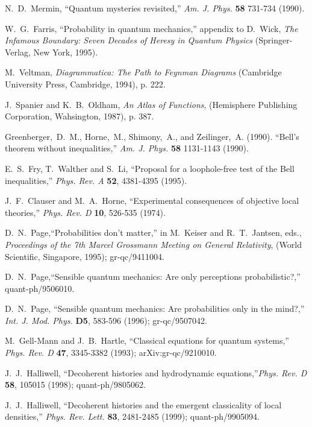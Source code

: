 \documentclass[12pt]{article}
\begin{document}
{\begin{thebibliography}{99}
 N.~D.~Mermin,  ``Quantum mysteries revisited,'' {\em Am. J. Phys.}\/
{\bf 58} 731-734 (1990).

 W.~G.~Farris, ``Probability in quantum mechanics,'' appendix to
D.~Wick, {\em The Infamous Boundary: Seven Decades of Heresy in Quantum Physics}
(Springer-Verlag, New York, 1995). 




 M.~Veltman, {\em Diagrammatica: The Path to Feynman
Diagrams}\/ (Cambridge University Press, Cambridge, 1994),  p. 222.



J.~Spanier and K.~B.~Oldham, {\em An Atlas of Functions},\/ (Hemisphere Publishing Corporation,
Wahsington, 1987), p. 387.


 Greenberger,~D.~M., Horne,~M., Shimony,~A., and Zeilinger,~A. (1990).  ``Bell's theorem without
inequalities,'' {\em Am. J. Phys.}\/ {\bf 58} 1131-1143 (1990). 

E.~S.~Fry, T.~Walther and S.~Li, ``Proposal for a loophole-free test of the Bell inequalities,''
{\em Phys. Rev. A}\/ {\bf 52}, 4381-4395 (1995).

J.~F.~Clauser and M.~A.~Horne, ``Experimental consequences of objective local theories,''
{\em Phys. Rev. D}\/ {\bf 10}, 526-535 (1974).

D.~N.~Page,``Probabilities don't matter,'' in M.~Keiser and
R.~T.~Jantsen, eds., {\em Proceedings of the 7th Marcel Grossmann
Meeting on General Relativity},\/ (World Scientific, Singapore, 1995); gr-qc/9411004.

D.~N.~Page,``Sensible quantum mechanics: Are only perceptions probabilistic?,''
quant-ph/9506010.

D.~N.~Page, ``Sensible quantum mechanics: Are probabilities 
only in the mind?,'' {\em Int. J. Mod. Phys.}\/ {\bf D5}, 583-596 (1996); gr-qc/9507042.


M.~Gell-Mann and J.~B.~Hartle, ``Classical equations for quantum systems,'' {\em Phys. Rev. D}\/
{\bf 47}, 3345-3382 (1993); arXiv:gr-qc/9210010.

J.~J.~Halliwell, ``Decoherent histories and hydrodynamic equations,''{\em Phys. Rev. D}\/ {\bf 58}, 105015 (1998);
quant-ph/9805062.

J.~J.~Halliwell, ``Decoherent histories and the emergent classicality of local densities,'' {\em Phys. Rev. Lett.}\/
{\bf 83}, 2481-2485 (1999); quant-ph/9905094.


\end{thebibliography}}
\end{document}
